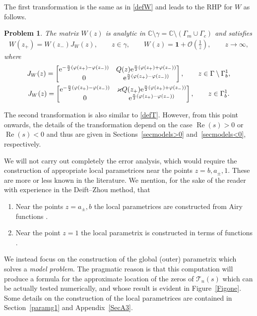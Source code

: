 \documentclass[pdftex]{sigma}
\numberwithin{equation}{section}
\newtheorem{problem}[Theorem]{Problem}
\theoremstyle{definition}
\def\le{\left}
\def\ri{\right}
\def \1{\mathbf 1}
\def\C{{\mathbb C}}
\def \Re{\operatorname{Re} }
\begin{document}
The first transformation is the same as in \eqref{defW} and leads to the RHP for $W$ as follows.
\begin{problem}
\label{RHPWs>0}The matrix $W(z)$ is analytic in $\C \setminus \gamma = \C\setminus (\Gamma_m\cup \Gamma_c)$ and satisfies
\begin{gather*}
W(z_+)= W(z_-) J_W(z), \qquad z\in \gamma,\qquad
W(z) = \1 + \mathcal O\le(\frac 1 z \ri), \qquad z\to \infty,
\end{gather*}
where
\begin{gather*}
J_W(z)
=\begin{bmatrix}
{\rm e}^{-\frac n2\le( \varphi(z_+)-\varphi(z_-)\ri) } & Q(z) {\rm e}^{ \frac n2 \le(\varphi(z_+)+\varphi(z_-)\ri)}\\
0 & {\rm e}^{\frac n2 \le(\varphi(z_+)-\varphi(z_-) \ri)}
\end{bmatrix},\qquad z\in \Gamma\setminus \Gamma_{b}^1,
\\
J_W(z)
=\begin{bmatrix}
{\rm e}^{-\frac n2\le( \varphi(z_+)-\varphi(z_-)\ri) } & \varkappa Q(z_+) {\rm e}^{ \frac n2 \le(\varphi(z_+)+\varphi(z_-)\ri)}\\
0 & {\rm e}^{\frac n2 \le(\varphi(z_+)-\varphi(z_-) \ri)}
\end{bmatrix},\qquad z\in \Gamma_{b}^1.
\end{gather*}
\end{problem}
The second transformation is also similar to \eqref{defT}. However, from this point onwards, the details of the transformation depend on the case $\Re(s)>0$ or $\Re(s)<0$ and thus are given in Sections~\ref{secmodels>0} and~\ref{secmodels<0}, respectively.

We will not carry out completely the error analysis, which would require the construction of appropriate local parametrices near the points $z= b, a_\pm, 1$. These are more or less known in the literature. We mention, for the sake of the reader with experience in the Deift--Zhou method, that
\begin{enumerate}\itemsep=0pt
\item[(1)] Near the points $z= a_\pm, b$ the local parametrices are constructed from Airy functions \cite{BertolaBothner,DKMVZ}.
\item[(2)] Near the point $z=1$ the local parametrix is constructed in terms of functions \cite{VanlessenStrong}.
\end{enumerate}
We instead focus on the construction of the global (outer) parametrix which solves a {\it model problem}. The pragmatic reason is that this computation will produce a formula for the approximate location of the zeros of $\mathcal T_n(s)$ which can be actually tested numerically, and whose result is evident in Figure~\ref{Figone}.
Some details on the construction of the local parametrices are contained in Section~\ref{paramg1} and Appendix~\ref{SecA3}.
\end{document}
